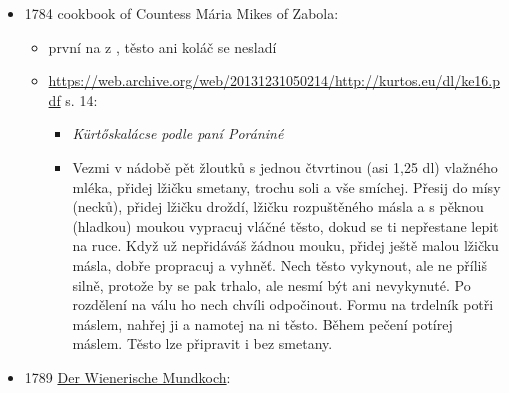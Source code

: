 \begin{itemize}
\begin{itemize}
    \begin{itemize}
    \tightlist
    \item
      Spieß-Krapfen im Schmalz gebacken.
    \item
      Nejprve vezmi ½ libry jemné pšeničné mouky, čtvrtlibru jemně
      tlučeného a prosátého cukru, jemně krájenou kůru z jednoho
      citronu, skořici, hřebíček a muškátový květ, vše jemně rozdrcené,
      dále máslo za jeden krejcar, 5 žloutků a 2 lžíce sladké smetany. Z
      toho všeho udělej těsto.
    \item
      Těsto vyválej na tloušťku hřbetu nože, polož je na příslušný plech
      tak, aby přesně lícovalo, a svazuj je provázkem do kroužků. Poté
      je pomalu smaž v sádle v hrnci, aby hezky nabyly. Nakonec je dobře
      posyp cukrem a podávej na stůl.
    \end{itemize}
  \item
    zajímavý je, že tam jsou dva recepty pojmenovaný prügelkrapfen nebo
    spiesskrapfen, který jsou smažený
  \end{itemize}
\item
  1784 cookbook of Countess Mária Mikes of Zabola:

  \begin{itemize}
  \tightlist
  \item
    první  na  z
     , těsto ani koláč se nesladí
  \item
    \url{https://web.archive.org/web/20131231050214/http://kurtos.eu/dl/ke16.pdf}
    s. 14:

    \begin{itemize}
    \tightlist
    \item
      \emph{Kürtőskalácse podle paní Porániné}
    \item
      Vezmi v nádobě pět žloutků s jednou čtvrtinou (asi 1,25 dl)
      vlažného mléka, přidej lžičku smetany, trochu soli a vše smíchej.
      Přesij do mísy (necků), přidej lžičku droždí, lžičku rozpuštěného
      másla a s pěknou (hladkou) moukou vypracuj vláčné těsto, dokud se
      ti nepřestane lepit na ruce. Když už nepřidáváš žádnou mouku,
      přidej ještě malou lžičku másla, dobře propracuj a vyhněť. Nech
      těsto vykynout, ale ne příliš silně, protože by se pak trhalo, ale
      nesmí být ani nevykynuté. Po rozdělení na válu ho nech chvíli
      odpočinout. Formu na trdelník potři máslem, nahřej ji a namotej na
      ni těsto. Během pečení potírej máslem. Těsto lze připravit i bez
      smetany.
    \end{itemize}
  \end{itemize}
\item
  1789
  \href{https://digi.ub.uni-heidelberg.de/diglit/wienerische_mundkoch1789/0523/image,info}{Der
  Wienerische Mundkoch}:


\end{itemize}
